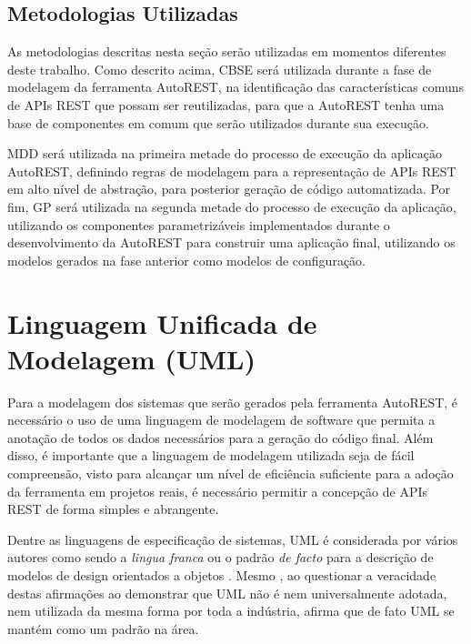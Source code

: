 \subsection{Metodologias Utilizadas}

As metodologias descritas nesta seção serão utilizadas em momentos diferentes deste trabalho. Como descrito acima, CBSE será utilizada durante a fase de modelagem da ferramenta AutoREST, na identificação das características comuns de APIs REST que possam ser reutilizadas, para que a AutoREST tenha uma base de componentes em comum que serão utilizados durante sua execução.

MDD será utilizada na primeira metade do processo de execução da aplicação AutoREST, definindo regras de modelagem para a representação de APIs REST em alto nível de abstração, para posterior geração de código automatizada. Por fim, GP será utilizada na segunda metade do processo de execução da aplicação, utilizando os componentes parametrizáveis implementados durante o desenvolvimento da AutoREST para construir uma aplicação final, utilizando os modelos gerados na fase anterior como modelos de configuração.


\section{Linguagem Unificada de Modelagem (UML)}

Para a modelagem dos sistemas que serão gerados pela ferramenta AutoREST, é necessário o uso de uma linguagem de modelagem de software que permita a anotação de todos os dados necessários para a geração do código final. Além disso, é importante que a linguagem de modelagem utilizada seja de fácil compreensão, visto para alcançar um nível de eficiência suficiente para a adoção da ferramenta em projetos reais, é necessário permitir a concepção de APIs REST de forma simples e abrangente.

Dentre as linguagens de especificação de sistemas, UML é considerada por vários autores como sendo a \textit{lingua franca} \cite{EVANS:2000} ou o padrão \textit{de facto} para a descrição de modelos de design orientados a objetos \cite{BUDGEN:2011}. Mesmo , ao questionar a veracidade destas afirmações ao demonstrar que UML não é nem universalmente adotada, nem utilizada da mesma forma por toda a indústria, afirma que de fato UML se mantém como um padrão na área.

